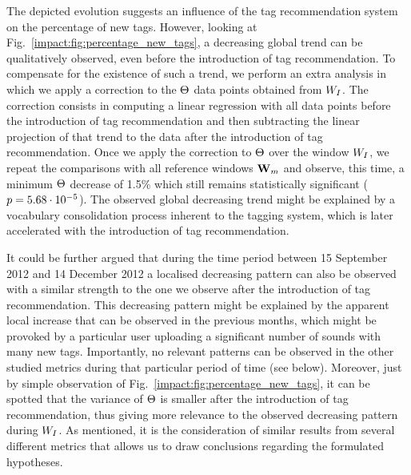 The depicted evolution suggests an influence of the tag recommendation system on the percentage of new tags. However, looking at Fig.~\ref{impact:fig:percentage_new_tags}, a decreasing global trend can be qualitatively observed, even before the introduction of tag recommendation.
To compensate for the existence of such a trend, we perform an extra analysis in which we apply a correction to the $\Theta$ data points obtained from $W_I$. The correction consists in computing a linear regression with all data points before the introduction of tag recommendation and then subtracting the linear projection of that trend to the data after the introduction of tag recommendation. Once we apply the correction to $\Theta$ over the window $W_I$, we repeat the comparisons with all reference windows $\mathbf{W}_m$ and observe, this time, a minimum $\Theta$ decrease of 1.5\% which still remains statistically significant ($p = 5.68\cdot 10^{-5}$).
The observed global decreasing trend might be explained by a vocabulary consolidation process inherent to the tagging system, which is later accelerated with the introduction of tag recommendation.

It could be further argued that during the time period between 15 September 2012 and 14 December 2012 a localised decreasing pattern can also be observed with a similar strength to the one we observe after the introduction of tag recommendation. 
This decreasing pattern might be explained by the apparent local increase that can be observed in the previous months, which might be provoked by a particular user uploading a significant number of sounds with many new tags. Importantly, no relevant patterns can be observed in the other studied metrics during that particular period of time (see below). Moreover, just by simple observation of Fig.~\ref{impact:fig:percentage_new_tags}, it can be spotted that the variance of $\Theta$ is smaller after the introduction of tag recommendation, thus giving more relevance to the observed decreasing pattern during $W_I$. 
As mentioned, it is the consideration of similar results from several different metrics that allows us to draw conclusions regarding the formulated hypotheses. 




